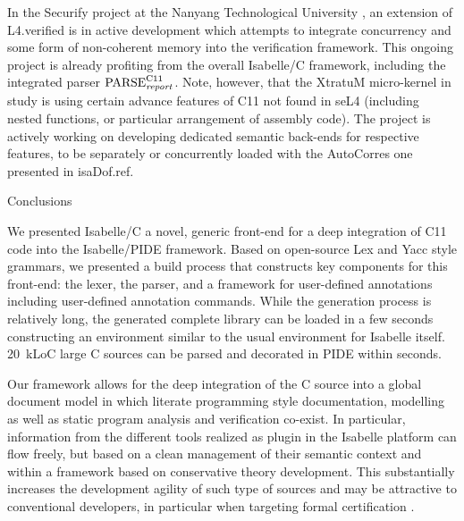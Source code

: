 \begin{isabellebody}
\begin{isamarkupsubsection*}
\end{isamarkupsubsection*}\isamarkuptrue%
%
\begin{isamarkuptext}%
In the Securify project at the Nanyang Technological University \cite{DBLP:conf/tacas/SananZHZTL17,DBLP:conf/itp/HouSTL17}, an extension of L4.verified is in
active development which attempts to integrate concurrency and some form of non-coherent memory into
the verification framework. This ongoing project is already profiting from the overall Isabelle/C
framework, including the integrated parser $\text{PARSE}_{\text{\emph{report}}}^{\text{C11}}$. Note,
however, that the XtratuM micro-kernel \cite{DBLP:journals/sigbed/CarrascosaCMBC14} in study is
using certain advance features of C11 not found in seL4 (including nested functions, or particular
arrangement of assembly code). The project is actively working on developing dedicated semantic
back-ends for respective features, to be separately or concurrently loaded with the AutoCorres one
presented in \csname isaDof.ref.%
\end{isamarkuptext}\isamarkuptrue%
%
\begin{isamarkupsection*}%
[label = {concl},type = {scholarly_paper.conclusion}, args={label = {concl},type = {scholarly_paper.conclusion}, Isa_COL.text_element.level = {}, Isa_COL.text_element.referentiable = {False}, Isa_COL.text_element.variants = {{STR ''outline'', STR ''document''}}, scholarly_paper.text_section.main_author = {}, scholarly_paper.text_section.fixme_list = {}, Isa_COL.text_element.level = {}, scholarly_paper.text_section.main_author = {}}]Conclusions%
\end{isamarkupsection*}\isamarkuptrue%
%
\begin{isamarkuptext}%
We presented Isabelle/C a novel, generic front-end for a deep integration of C11 code into the 
Isabelle/PIDE framework. Based on open-source Lex and Yacc style grammars, we presented a build process 
that constructs key components for this front-end: the lexer, the parser, and a framework for 
user-defined annotations including user-defined annotation commands. 
While the generation process is relatively long, the generated complete library can be loaded in a 
few seconds constructing an environment similar to the usual  environment for 
Isabelle itself. 20~kLoC large  C sources can be parsed and decorated in PIDE within  seconds.

Our framework allows for the deep integration of the C source into a global document model in which 
literate programming style documentation, modelling as well as static program analysis and verification 
co-exist.  In particular, information from the different tools realized as plugin in the Isabelle 
platform  can flow freely, but based on a clean management of their semantic context and within a 
framework based on conservative theory development. This substantially increases the development agility 
of such type of sources and may be  attractive to  conventional developers, in particular when 
targeting formal certification \cite{DBLP:conf/mkm/BruckerACW18}.


\end{isamarkuptext}
\end{isabellebody}

